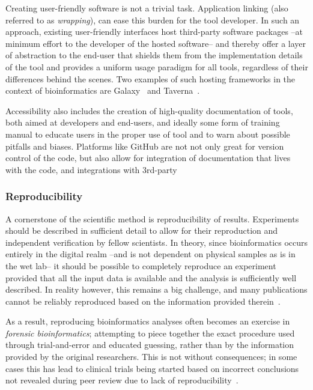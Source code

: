 \begin{justify}
Creating user-friendly software is not a trivial task. Application linking (also referred to as \emph{wrapping}), can ease this burden for the tool developer. In such an approach, existing user-friendly interfaces host third-party software packages --at minimum effort to the developer of the hosted software-- and thereby offer a layer of abstraction to the end-user that shields them from the implementation details of the tool and provides a uniform usage paradigm for all tools, regardless of their differences behind the scenes. Two examples of such hosting frameworks in the context of bioinformatics are Galaxy~\cite{giardine2005galaxy,goecks2010galaxy} and Taverna~\cite{oinn2004taverna}.

Accessibility also includes the creation of high-quality documentation of tools, both aimed at developers and end-users, and ideally some form of training manual to educate users in the proper use of tool and to warn about possible pitfalls and biases. Platforms like GitHub are not not only great for version control of the code, but also allow for integration of documentation that lives with the code, and integrations with 3rd-party

\subsubsection{Reproducibility}

A cornerstone of the scientific method is reproducibility of results. Experiments should be described in sufficient detail to allow for their reproduction and independent verification by fellow scientists. In theory, since bioinformatics occurs entirely in the digital realm --and is not dependent on physical samples as is in the wet lab-- it should be possible to completely reproduce an experiment provided that all the input data is available and the analysis is sufficiently well described. In reality however, this remains a big challenge, and many publications cannot be reliably reproduced based on the information provided therein~\cite{baggerly2009reproducible,kim2018reproducibility}.

As a result, reproducing bioinformatics analyses often becomes an exercise in \textit{forensic bioinformatics}; attempting to piece together the exact procedure used through trial-and-error and educated guessing, rather than by the information provided by the original researchers.
This is not without consequences; in some cases this has lead to clinical trials being started based on incorrect conclusions not revealed during peer review due to lack of reproducibility~\cite{baggerly2009reproducible}.


\end{justify}
